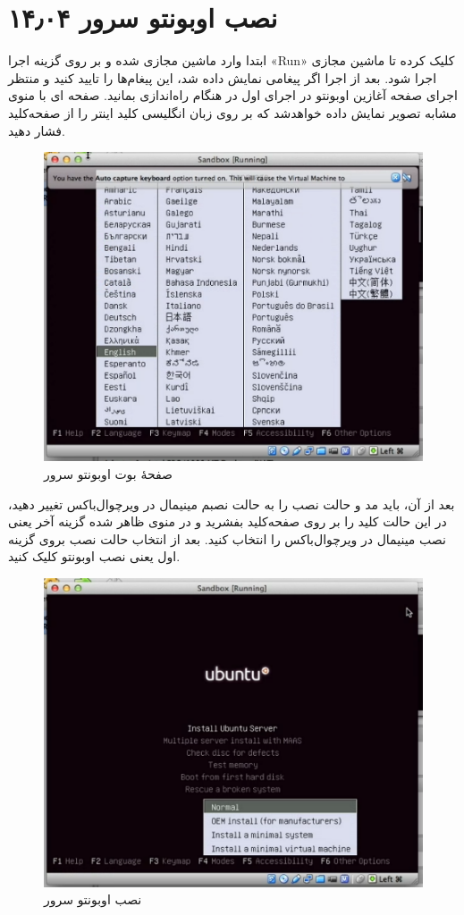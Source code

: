 \section{نصب اوبونتو سرور ۱۴٫۰۴}
ابتدا وارد ماشین مجازی شده و بر روی گزینه اجرا «Run» کلیک کرده تا ماشین مجازی اجرا شود. بعد از اجرا اگر پیغامی نمایش داده شد، این پیغام‌ها را تایید کنید و منتظر اجرای صفحه آغازین اوبونتو در اجرای اول در هنگام راه‌اندازی بمانید. صفحه ای با منوی مشابه تصویر نمایش داده خواهد‌شد که بر روی زبان انگلیسی کلید اینتر را از صفحه‌کلید فشار دهید.
\begin{figure}
    \includegraphics[width=.9\textwidth ,height=.65\textwidth]{Pic/UbuntuServer1}
    \caption{ صفحهٔ بوت اوبونتو سرور}
    \label{UbuntuServer1}
\end{figure}

بعد از آن، باید مد و حالت نصب را به حالت نصبم مینیمال در ویرچوال‌باکس تغییر دهید، در این حالت کلید 
 را بر روی صفحه‌کلید بفشرید و در منوی ظاهر شده گزینه آخر یعنی نصب مینیمال در ویرچوال‌باکس را انتخاب کنید. بعد از انتخاب حالت نصب بروی گزینه اول یعنی نصب اوبونتو کلیک کنید.
\begin{figure}
    \includegraphics[width=.9\textwidth ,height=.65\textwidth]{Pic/UbuntuServer2}
    \caption{ نصب اوبونتو سرور}
    \label{UbuntuServer2}
\end{figure}

